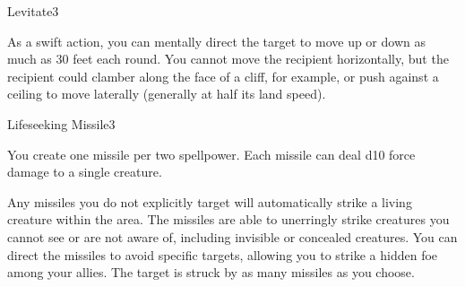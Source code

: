\begin{spellsection}{Levitate}{3}
    \begin{spellheader}
    \end{spellheader}
    \begin{spellcontent}
        \begin{spelltargetinginfo}
            \spellrng{\rngclose}
        \end{spelltargetinginfo}
        \begin{spelleffects}
            \spelleffect As a swift action, you can mentally direct the target to move up or down as much as 30 feet each round. You cannot move the recipient horizontally, but the recipient could clamber along the face of a cliff, for example, or push against a ceiling to move laterally (generally at half its land speed).
            \spelldur \durshort \dismissable
        \end{spelleffects}
    \end{spellcontent}
    \begin{spellfooter}
        \miscastrandom
    \end{spellfooter}
\end{spellsection}

\begin{spellsection}{Lifeseeking Missile}{3}
    \begin{spellheader}
    \end{spellheader}
    \begin{spellcontent}
        \begin{spelltargetinginfo}
        \end{spelltargetinginfo}
        \begin{spelleffects}
            \spellspecial You create one missile per two spellpower. Each missile can deal d10 force damage to a single creature.

            Any missiles you do not explicitly target will automatically strike a living creature within the area. The missiles are able to unerringly strike creatures you cannot see or are not aware of, including invisible or concealed creatures. You can direct the missiles to avoid specific targets, allowing you to strike a hidden foe among your allies.
            \spelleffect The target is struck by as many missiles as you choose.
        \end{spelleffects}
    \end{spellcontent}
    \begin{spellfooter}
        \miscastexplode
    \end{spellfooter}
\end{spellsection}

